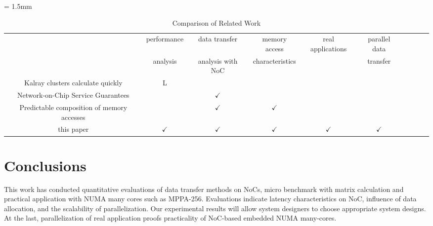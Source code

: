 \documentclass[conference,compsoc]{IEEEtran}
\begin{document}
\begin{table}[t]
  \caption{\label{tb:comparison_relatedwork}
    Comparison of Related Work}
  \vspace{-3mm}
  \centering
  \scriptsize	                    %
  \tabcolsep = 1.5mm              %
  \begin{tabular}{c|ccccccccc}
    \hline
    & performance & data transfer & memory access & \multirow{2}{*}{real applications} & parallel data & \\
    & analysis & analysis with NoC & characteristics & & transfer & \\
    \hline
    \hline
    Kalray clusters calculate quickly \cite{kanter2015kalray} & L &  &  &  &  & \\
    Network-on-Chip Service Guarantees \cite{denet2017work} &  & \(\checkmark\) &  &  &  & \\
    Predictable composition of memory accesses \cite{perret2016predictable} &  & \(\checkmark\) & \(\checkmark\) &  &  & \\
    this paper & \(\checkmark\) & \(\checkmark\) & \(\checkmark\) & \(\checkmark\) & \(\checkmark\) & \\
    \hline
  \end{tabular}
  \vspace{-5mm}
\end{table}

\vspace{-3mm}
\section{Conclusions}
\label{sec:conclusion}
\vspace{-3mm}
This work has conducted quantitative evaluations of data transfer methods on NoCs, micro benchmark with matrix calculation and practical application with NUMA many cores such as MPPA-256.
Evaluations indicate latency characteristics on NoC, influence of data allocation, and the scalability of parallelization.
Our experimental results will allow system designers to choose appropriate system designs.
At the last, parallelization of real application proofs practicality of NoC-based embedded NUMA many-cores.
\end{document}
